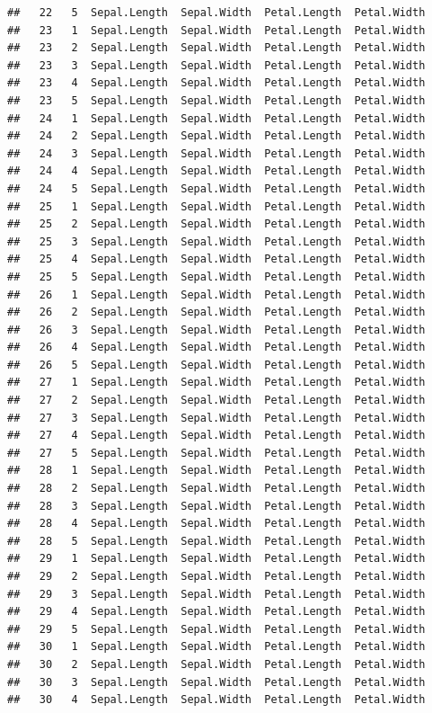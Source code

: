 \documentclass[
]{book}
\begin{document}
\begin{verbatim}
##   22   5  Sepal.Length  Sepal.Width  Petal.Length  Petal.Width
##   23   1  Sepal.Length  Sepal.Width  Petal.Length  Petal.Width
##   23   2  Sepal.Length  Sepal.Width  Petal.Length  Petal.Width
##   23   3  Sepal.Length  Sepal.Width  Petal.Length  Petal.Width
##   23   4  Sepal.Length  Sepal.Width  Petal.Length  Petal.Width
##   23   5  Sepal.Length  Sepal.Width  Petal.Length  Petal.Width
##   24   1  Sepal.Length  Sepal.Width  Petal.Length  Petal.Width
##   24   2  Sepal.Length  Sepal.Width  Petal.Length  Petal.Width
##   24   3  Sepal.Length  Sepal.Width  Petal.Length  Petal.Width
##   24   4  Sepal.Length  Sepal.Width  Petal.Length  Petal.Width
##   24   5  Sepal.Length  Sepal.Width  Petal.Length  Petal.Width
##   25   1  Sepal.Length  Sepal.Width  Petal.Length  Petal.Width
##   25   2  Sepal.Length  Sepal.Width  Petal.Length  Petal.Width
##   25   3  Sepal.Length  Sepal.Width  Petal.Length  Petal.Width
##   25   4  Sepal.Length  Sepal.Width  Petal.Length  Petal.Width
##   25   5  Sepal.Length  Sepal.Width  Petal.Length  Petal.Width
##   26   1  Sepal.Length  Sepal.Width  Petal.Length  Petal.Width
##   26   2  Sepal.Length  Sepal.Width  Petal.Length  Petal.Width
##   26   3  Sepal.Length  Sepal.Width  Petal.Length  Petal.Width
##   26   4  Sepal.Length  Sepal.Width  Petal.Length  Petal.Width
##   26   5  Sepal.Length  Sepal.Width  Petal.Length  Petal.Width
##   27   1  Sepal.Length  Sepal.Width  Petal.Length  Petal.Width
##   27   2  Sepal.Length  Sepal.Width  Petal.Length  Petal.Width
##   27   3  Sepal.Length  Sepal.Width  Petal.Length  Petal.Width
##   27   4  Sepal.Length  Sepal.Width  Petal.Length  Petal.Width
##   27   5  Sepal.Length  Sepal.Width  Petal.Length  Petal.Width
##   28   1  Sepal.Length  Sepal.Width  Petal.Length  Petal.Width
##   28   2  Sepal.Length  Sepal.Width  Petal.Length  Petal.Width
##   28   3  Sepal.Length  Sepal.Width  Petal.Length  Petal.Width
##   28   4  Sepal.Length  Sepal.Width  Petal.Length  Petal.Width
##   28   5  Sepal.Length  Sepal.Width  Petal.Length  Petal.Width
##   29   1  Sepal.Length  Sepal.Width  Petal.Length  Petal.Width
##   29   2  Sepal.Length  Sepal.Width  Petal.Length  Petal.Width
##   29   3  Sepal.Length  Sepal.Width  Petal.Length  Petal.Width
##   29   4  Sepal.Length  Sepal.Width  Petal.Length  Petal.Width
##   29   5  Sepal.Length  Sepal.Width  Petal.Length  Petal.Width
##   30   1  Sepal.Length  Sepal.Width  Petal.Length  Petal.Width
##   30   2  Sepal.Length  Sepal.Width  Petal.Length  Petal.Width
##   30   3  Sepal.Length  Sepal.Width  Petal.Length  Petal.Width
##   30   4  Sepal.Length  Sepal.Width  Petal.Length  Petal.Width

\end{verbatim}
\end{document}
